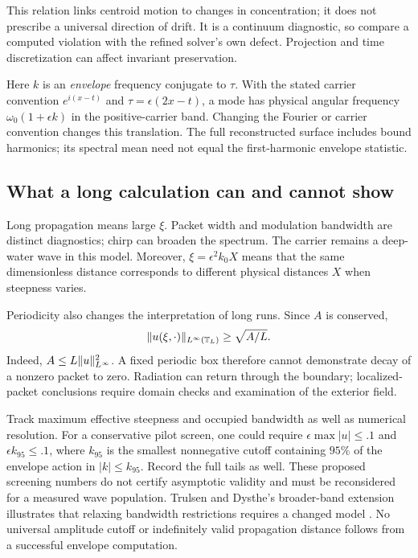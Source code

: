 This relation links centroid motion to changes in concentration; it does
not prescribe a universal direction of drift. It is a continuum diagnostic,
so compare a computed violation with the refined solver's own defect.
Projection and time discretization can affect invariant preservation.

Here $k$ is an \emph{envelope} frequency conjugate to $\tau$. With the stated
carrier convention $e^{i(x-t)}$ and $\tau=\epsilon(2x-t)$, a mode has
physical angular frequency $\omega_0(1+\epsilon k)$ in the positive-carrier
band. Changing the Fourier or carrier convention changes this translation.
The full reconstructed surface includes bound harmonics; its spectral mean
need not equal the first-harmonic envelope statistic.

\subsection{What a long calculation can and cannot show}

Long propagation means large $\xi$. Packet width and modulation bandwidth
are distinct diagnostics; chirp can broaden the spectrum. The carrier
remains a deep-water wave in this model. Moreover,
$\xi=\epsilon^2 k_0X$ means that the same dimensionless distance corresponds
to different physical distances $X$ when steepness varies.

Periodicity also changes the interpretation of long runs. Since $A$ is
conserved,
\begin{equation}
 \lVert u(\xi,\cdot)\rVert_{L^\infty(\mathbb T_L)}
 \geq\sqrt{A/L}.
 \label{eq:periodic-floor}
\end{equation}
Indeed, $A\leq L\lVert u\rVert_{L^\infty}^2$. A fixed periodic box therefore
cannot demonstrate decay of a nonzero packet to zero. Radiation can return
through the boundary; localized-packet conclusions require domain checks
and examination of the exterior field.

Track maximum effective steepness and occupied bandwidth as well as
numerical resolution. For a conservative pilot screen, one could require
$\epsilon\max|u|\leq.1$ and $\epsilon k_{95}\leq.1$, where $k_{95}$
is the smallest nonnegative cutoff containing $95\%$ of the envelope
action in $|k|\leq k_{95}$. Record the full tails as well. These proposed
screening numbers do not certify asymptotic validity and must be
reconsidered for a measured wave population. Trulsen and Dysthe's
broader-band extension illustrates
that relaxing bandwidth restrictions requires a changed model
\cite{broadband}. No universal amplitude cutoff or indefinitely valid
propagation distance follows from a successful envelope computation.

